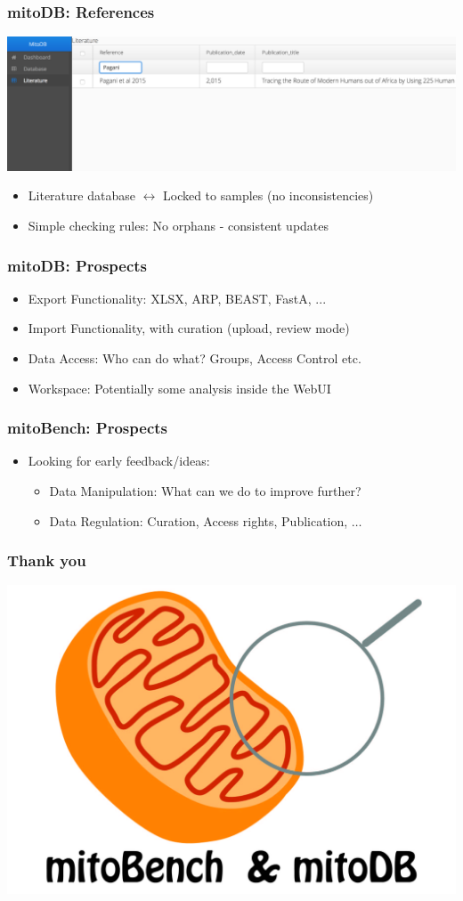 \documentclass{beamer} %
\begin{document}
\begin{frame}
\frametitle{mitoDB: References}
\centering
	\includegraphics[scale=0.25]{imagesDB/mitodb_references.png}
\begin{itemize}
\item Literature database $\leftrightarrow$ Locked to samples (no inconsistencies)
\item Simple checking rules: No orphans - consistent updates 
\end{itemize}
\end{frame}

\begin{frame}
\frametitle{mitoDB: Prospects}
\centering
\begin{itemize}
\item Export Functionality: XLSX, ARP, BEAST, FastA, ... \pause
\item Import Functionality, with curation (upload, review mode) \pause
\item Data Access: Who can do what? Groups, Access Control etc. \pause
\item Workspace: Potentially some analysis inside the WebUI
\end{itemize}
\end{frame}



\begin{frame}
\frametitle{mitoBench: Prospects}
\begin{itemize}
\item Looking for early feedback/ideas:
\begin{itemize}
\item Data Manipulation: What can we do to improve further? 
\item Data Regulation: Curation, Access rights, Publication, $\ldots$
\end{itemize}
\end{itemize}
\end{frame}

\begin{frame}
\frametitle{Thank you}
\centering
\includegraphics[scale=0.1]{imagesBench/mitoBenchLogo.jpg}
\end{frame}
\end{document}
